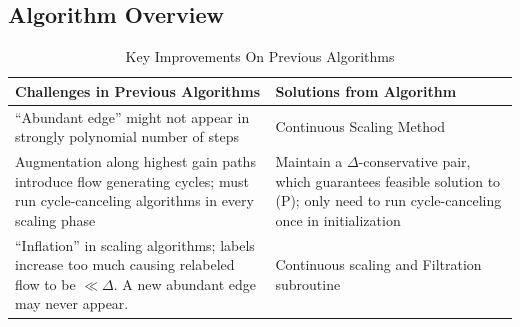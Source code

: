 \documentclass[11pt]{article}
\theoremstyle{definition}
\theoremstyle{definition}
\begin{document}
	\subsection{Algorithm Overview} 
	\begin{table}[H]
	\begin{center}
	    \begin{tabular}{ | p{7cm} | p{7cm} |}
	    \hline
	    Challenges in Previous Algorithms  & Solutions from Algorithm \\ \hline
	    ``Abundant edge'' might not appear in strongly polynomial number of steps \cite{Radzik2004} & Continuous Scaling Method  \\ \hline
	    Augmentation along highest gain paths introduce flow generating cycles; must run cycle-canceling algorithms in every scaling phase \cite{Goldberg:1991:CAG:105014.105022} & Maintain a $\Delta$-conservative pair, which guarantees feasible solution to (P); only need to run cycle-canceling once in initialization  \\ \hline
	    ``Inflation'' in scaling algorithms; labels increase too much causing relabeled flow to be $\ll \Delta$. A new abundant edge may never appear. & Continuous scaling and Filtration subroutine \\
	    \hline
	    \end{tabular}
	\end{center}
	\caption{Key Improvements On Previous Algorithms}
	\label{tab:improvementsInitial}
	\end{table}
\end{document}
